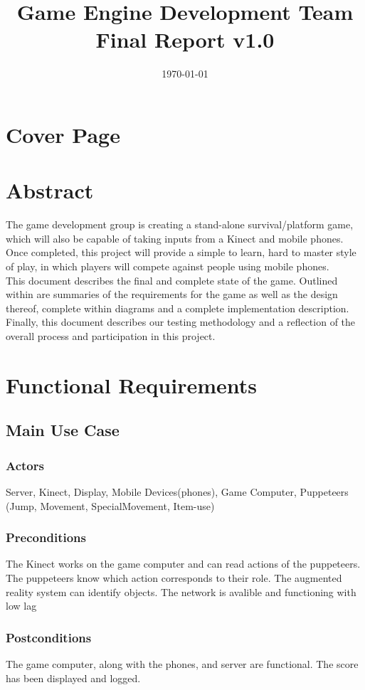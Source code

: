 \documentclass[10pt,letterpaper,oneside,english]{article}
\title{
	\textbf{Game Engine Development Team}\\
	Final Report v1.0
}
\author{
	\person{Bahr}{Dan}{dbahr92@gmail.com}
	\and
	\person{Bard}{Etan}{ebard@ups.edu}
	\and
	\person{Burns}{Nick}{nbburns@ups.edu}
	\and
	\person{Livingston}{Chris}{christopherlivingston92@gmail.com}
	\and
	\person{Wilson}{Robin}{rkwilson@ups.edu}
}
\date{\today}
\begin{document}
\maketitle
\newpage

\tableofcontents
\newpage

\section{Cover Page}

\section{Abstract}
The game development group is creating a stand-alone survival/platform game, which will also be capable of taking inputs from a Kinect and mobile phones. Once completed, this project will provide a simple to learn, hard to master style of play, in which players will compete against people using mobile phones.\\
This document describes the final and complete state of the game. Outlined within are summaries of the requirements for the game as well as the design thereof, complete within diagrams and a complete implementation description. Finally, this document describes our testing methodology and a reflection of the overall process and participation in this project.

\section{Functional Requirements}

\subsection{Main Use Case}
\subsubsection{Actors} Server, Kinect, Display, Mobile Devices(phones), Game Computer, Puppeteers (Jump, Movement, SpecialMovement, Item-use)
\subsubsection{Preconditions} The Kinect works on the game computer and can read actions of the puppeteers. The puppeteers know which action corresponds to their role. The augmented reality system can identify objects. The network is avalible and functioning with low lag
\subsubsection{Postconditions} The game computer, along with the phones, and server are functional. The score has been displayed and logged.
\end{document}
